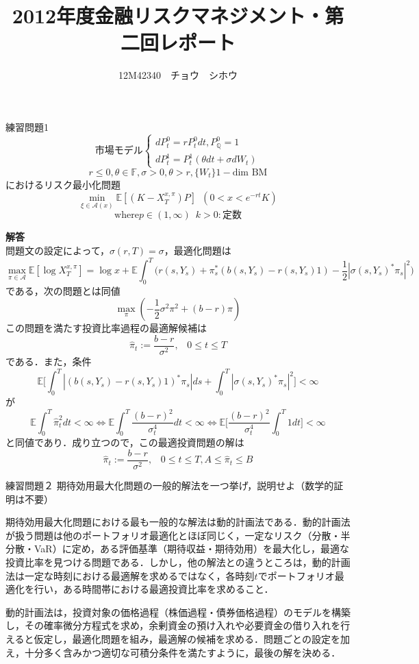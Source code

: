 \documentclass[a4paper,11pt]{jsarticle}
\title{2012年度金融リスクマネジメント・第二回レポート}
\author{12M42340　チョウ　シホウ}
\date{}
\numberwithin{theorem}{section}  %
\numberwithin{equation}{section} %
\begin{document}
{}
\renewcommand{\thepart}{\arabic{part}}

\maketitle
\begin{itembox}[l]{練習問題1}
\begin{equation*}
\text{市場モデル}\begin{cases}
d P_t^0 = r P_t^0dt,P_{\mathbb{Q}}^0 = 1\\
d P_t^1 = P_t^1(\theta dt + \sigma d W_t)
\end{cases}
\end{equation*}
\[
r \le 0, \theta \in \mathbb{F}, \sigma > 0, \theta > r, \{W_t\}1-\text{dim BM}
\]
におけるリスク最小化問題
\[
\min_{\xi \in \mathcal{A}(x)} \mathbb{E}[(K-X_T^{x,\pi})P] \,\,\, (0 < x < e^{-rt}K )
\]
\[
\text{where} p \in (1,\infty)\,\,\,k>0:\text{定数}
\]
\end{itembox}
{\bf 解答}\\

問題文の設定によって，$\sigma(r,T) = \sigma$，最適化問題は
\[
\max_{\pi \in \mathcal{A} }\mathbb{E}[\log X_T^{x,\pi}] = \log x+\mathbb{E}\int_0^T \Bigr( r(s,Y_s) + \pi_s^*(b(s,Y_s)-r(s,Y_s)1) - \frac{1}{2}|\sigma(s,Y_s)^*\pi_s|^2 \Bigr)
\]
である，次の問題とは同値
\[
\max_{\pi} (-\frac{1}{2}\sigma^2\pi^2+(b-r)\pi)
\]
この問題を満たす投資比率過程の最適解候補は
\[
\hat{\pi}_t := \frac{b-r}{\sigma^2},\,\,\,\,\, 0\le t \le T
\]
である．また，条件
\[
\mathbb{E}\Bigr[ \int_0^T| (b(s,Y_s) -r(s, Y_s)1)^*\pi_s |ds + \int_0^T |\sigma(s,Y_s)^*\pi_s|^2 \Bigr] < \infty
\]
が\[
\mathbb{E}\int_0^T \hat{\pi}_t^2 dt < \infty \Leftrightarrow
\mathbb{E}\int_0^T \frac{(b-r)^2}{\sigma_t^4} dt < \infty \Leftrightarrow
\mathbb{E}\Bigr[ \frac{(b-r)^2}{\sigma_t^4} \int_0^T 1 dt \Bigr] < \infty
\]
と同値であり．成り立つので，この最適投資問題の解は
\[
\hat{\pi}_t := \frac{b-r}{\sigma^2},\,\,\,\,\, 0\le t \le T, A \le \hat{\pi}_t \le B
\]


\begin{itembox}[l]{練習問題２}
期待効用最大化問題の一般的解法を一つ挙げ，説明せよ（数学的証明は不要）
\end{itembox}

期待効用最大化問題における最も一般的な解法は動的計画法である．動的計画法が扱う問題は他のポートフォリオ最適化とほぼ同じく，一定なリスク（分散・半分散・VaR）に定め，ある評価基準（期待収益・期待効用）を最大化し，最適な投資比率を見つける問題である．しかし，他の解法との違うところは，動的計画法は一定な時刻における最適解を求めるではなく，各時刻$t$でポートフォリオ最適化を行い，ある時間帯における最適投資比率を求めること．

動的計画法は，投資対象の価格過程（株価過程・債券価格過程）のモデルを構築し，その確率微分方程式を求め，余剰資金の預け入れや必要資金の借り入れを行えると仮定し，最適化問題を組み，最適解の候補を求める．問題ごとの設定を加え，十分多く含みかつ適切な可積分条件を満たすように，最後の解を決める．
\end{document}
